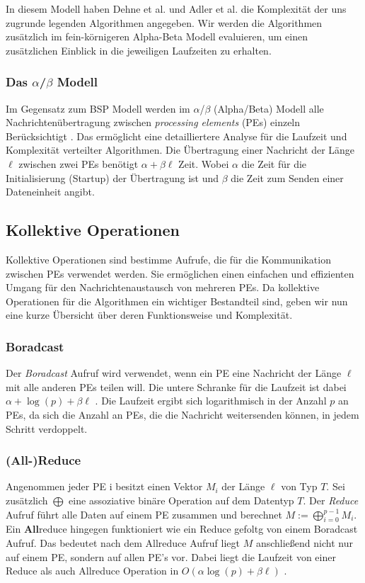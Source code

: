In diesem Modell haben Dehne et al. \cite{dehne1998practical} und Adler et al. \cite{adler1998communication} die Komplexität der uns zugrunde legenden Algorithmen angegeben. Wir werden die Algorithmen zusätzlich im fein-körnigeren Alpha-Beta Modell evaluieren, um einen zusätzlichen Einblick in die jeweiligen Laufzeiten zu erhalten.






\subsubsection{Das \boldmath$\alpha$/$\beta$ Modell}
Im Gegensatz zum BSP Modell werden im $\alpha$/$\beta$ (Alpha/Beta) Modell alle Nachrichtenübertragung zwischen \textit{processing elements} (PEs) einzeln Berücksichtigt \cite{sanders2019sequential}. Das ermöglicht eine detailliertere Analyse für die Laufzeit und Komplexität verteilter Algorithmen.
Die Übertragung einer Nachricht der Länge $\ell$ zwischen zwei PEs benötigt $\alpha + \beta \ell$ Zeit. Wobei $\alpha$ die Zeit für die Initialisierung (Startup) der Übertragung ist und $\beta$ die Zeit zum Senden einer Dateneinheit angibt.


\subsection{Kollektive Operationen}
Kollektive Operationen sind bestimme Aufrufe, die für die Kommunikation zwischen PEs verwendet werden.
Sie ermöglichen einen einfachen und effizienten Umgang für den Nachrichtenaustausch von mehreren PEs. Da kollektive Operationen für die Algorithmen ein wichtiger Bestandteil sind, geben wir nun eine kurze Übersicht über deren Funktionsweise und Komplexität. 

\subsubsection{Boradcast}
Der \emph{Boradcast} Aufruf wird verwendet, wenn ein PE eine Nachricht der Länge $\ell$ mit alle anderen PEs teilen will. Die untere Schranke für die Laufzeit ist dabei $\alpha + \log(p) + \beta \ell$ \cite{sanders2009two}. 
Die Laufzeit ergibt sich logarithmisch in der Anzahl $p$ an PEs, da sich die Anzahl an PEs, die die Nachricht weitersenden können, in jedem Schritt verdoppelt.

\subsubsection{(All-)Reduce}
Angenommen jeder PE i besitzt einen Vektor $M_i$ der Länge $\ell$ von Typ $T$. Sei zusätzlich $\bigoplus$ eine assoziative binäre Operation auf dem Datentyp $T$.
Der \emph{Reduce} Aufruf führt alle Daten auf einem PE zusammen und berechnet $M := \bigoplus_{i=0}^{p-1} M_i$. Ein \textbf{All}reduce hingegen funktioniert  wie ein Reduce gefoltg von einem Boradcast Aufruf.
Das bedeutet nach dem Allreduce Aufruf liegt  $M$ anschließend nicht nur auf einem PE, sondern auf allen PE's vor. Dabei liegt die Laufzeit von einer Reduce als auch Allreduce Operation in $O(\alpha \log(p) + \beta \ell)$ \cite{sanders2009two}.
